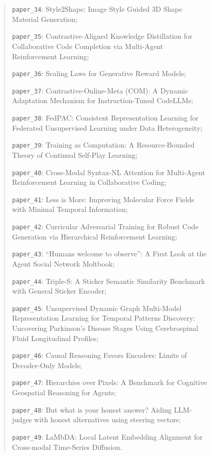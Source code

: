 \begin{figure}[h]
{\begin{quote}
    \texttt{paper\_34}: Style2Shape: Image Style Guided 3D Shape Material Generation;\par
    \texttt{paper\_35}: Contrastive-Aligned Knowledge Distillation for Collaborative Code Completion via Multi-Agent Reinforcement Learning;\par
    \texttt{paper\_36}: Scaling Laws for Generative Reward Models;\par
    \texttt{paper\_37}: Contrastive-Online-Meta (COM): A Dynamic Adaptation Mechanism for Instruction-Tuned CodeLLMs;\par
    \texttt{paper\_38}: FedPAC: Consistent Representation Learning for Federated Unsupervised Learning under Data Heterogeneity;\par
    \texttt{paper\_39}: Training as Computation: A Resource-Bounded Theory of Continual Self-Play Learning;\par
    \texttt{paper\_40}: Cross-Modal Syntax-NL Attention for Multi-Agent Reinforcement Learning in Collaborative Coding;\par
    \texttt{paper\_41}: Less is More: Improving Molecular Force Fields with Minimal Temporal Information;\par
    \texttt{paper\_42}: Curricular Adversarial Training for Robust Code Generation via Hierarchical Reinforcement Learning;\par
    \texttt{paper\_43}: ``Humans welcome to observe'': A First Look at the Agent Social Network Moltbook;\par
    \texttt{paper\_44}: Triple-S: A Sticker Semantic Similarity Benchmark with General Sticker Encoder;\par
    \texttt{paper\_45}: Unsupervised Dynamic Graph Multi-Model Representation Learning for Temporal Patterns Discovery: Uncovering Parkinson's Disease Stages Using Cerebrospinal Fluid Longitudinal Profiles;\par
    \texttt{paper\_46}: Causal Reasoning Favors Encoders: Limits of Decoder-Only Models;\par
    \texttt{paper\_47}: Hierarchies over Pixels: A Benchmark for Cognitive Geospatial Reasoning for Agents;\par
    \texttt{paper\_48}: But what is your honest answer? Aiding LLM-judges with honest alternatives using steering vectors;\par
    \texttt{paper\_49}: LaMbDA: Local Latent Embedding Alignment for Cross-modal Time-Series Diffusion.
    \end{quote}

}
\end{figure}
